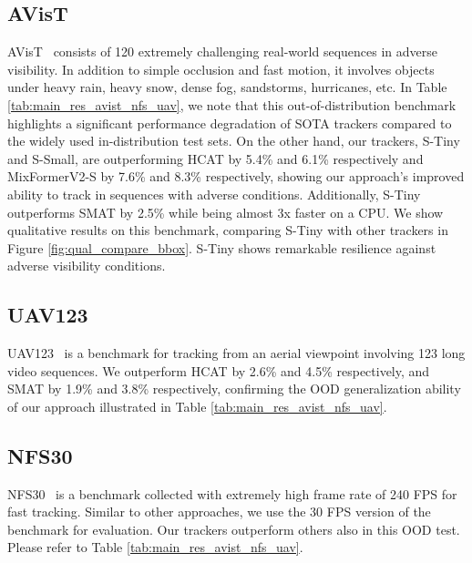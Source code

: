   \subsection{AVisT} 
  AVisT~\cite{noman2022avist} consists of 120 extremely challenging real-world sequences in adverse visibility.
  In addition to simple occlusion and fast motion, it involves objects under heavy rain, heavy snow, dense fog, sandstorms, hurricanes, etc. In Table \ref{tab:main_res_avist_nfs_uav}, we note that this out-of-distribution benchmark highlights a significant performance degradation of SOTA trackers compared to the widely used in-distribution test sets. On the other hand, our trackers, S-Tiny and S-Small, are outperforming HCAT by 5.4\% and 6.1\% respectively and MixFormerV2-S\cite{cui2024mixformerv2} by 7.6\% and 8.3\% respectively, showing our approach's improved ability to track in sequences with adverse conditions. Additionally, S-Tiny outperforms SMAT\cite{gopal2024separable} by 2.5\% while being almost 3x faster on a CPU. We show qualitative results on this benchmark, comparing S-Tiny with other trackers in Figure \ref{fig:qual_compare_bbox}. S-Tiny shows remarkable resilience against adverse visibility conditions. 
  
  \subsection{UAV123}
  UAV123~\cite{mueller2016benchmark}  is a benchmark for tracking from an aerial viewpoint involving 123 long video sequences. We outperform HCAT by 2.6\% and 4.5\% respectively, and SMAT by 1.9\% and 3.8\% respectively, confirming the OOD generalization ability of our approach illustrated in Table \ref{tab:main_res_avist_nfs_uav}.


  \subsection{NFS30}
  NFS30~\cite{kiani2017need}  is a benchmark collected with extremely high frame rate of 240 FPS for fast tracking. Similar to other approaches, we use the 30 FPS version of the benchmark for evaluation. Our trackers outperform others also in this OOD test. Please refer to Table \ref{tab:main_res_avist_nfs_uav}.
  
